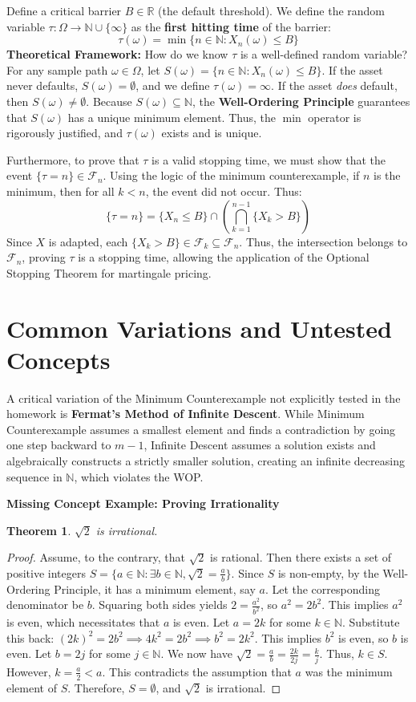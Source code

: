 \documentclass[11pt, a4paper]{article}
\newtheorem{theorem}{Theorem}[section]
\theoremstyle{definition}
\theoremstyle{remark}
\newcommand{\R}{\mathbb{R}}
\newcommand{\N}{\mathbb{N}}
\newcommand{\F}{\mathcal{F}}
\begin{document}
Define a critical barrier $B \in \R$ (the default threshold). We define the random variable $\tau : \Omega \to \N \cup \{\infty\}$ as the \textbf{first hitting time} of the barrier:
\[
\tau(\omega) = \min \{ n \in \N : X_n(\omega) \le B \}
\]
\textbf{Theoretical Framework:} How do we know $\tau$ is a well-defined random variable? 
For any sample path $\omega \in \Omega$, let $S(\omega) = \{ n \in \N : X_n(\omega) \le B \}$. 
If the asset never defaults, $S(\omega) = \emptyset$, and we define $\tau(\omega) = \infty$. 
If the asset \textit{does} default, then $S(\omega) \neq \emptyset$. Because $S(\omega) \subseteq \N$, the \textbf{Well-Ordering Principle} guarantees that $S(\omega)$ has a unique minimum element. Thus, the $\min$ operator is rigorously justified, and $\tau(\omega)$ exists and is unique. 

Furthermore, to prove that $\tau$ is a valid stopping time, we must show that the event $\{\tau = n\} \in \F_n$. 
Using the logic of the minimum counterexample, if $n$ is the minimum, then for all $k < n$, the event did not occur. Thus:
\[
\{\tau = n\} = \{X_n \le B\} \cap \left( \bigcap_{k=1}^{n-1} \{X_k > B\} \right)
\]
Since $X$ is adapted, each $\{X_k > B\} \in \F_k \subseteq \F_n$. Thus, the intersection belongs to $\F_n$, proving $\tau$ is a stopping time, allowing the application of the Optional Stopping Theorem for martingale pricing.

\newpage
\section{Common Variations and Untested Concepts}

A critical variation of the Minimum Counterexample not explicitly tested in the homework is \textbf{Fermat's Method of Infinite Descent}. While Minimum Counterexample assumes a smallest element and finds a contradiction by going one step backward to $m-1$, Infinite Descent assumes a solution exists and algebraically constructs a strictly smaller solution, creating an infinite decreasing sequence in $\N$, which violates the WOP.

\textbf{Missing Concept Example: Proving Irrationality}
\begin{theorem}
$\sqrt{2}$ is irrational.
\end{theorem}
\begin{proof}
Assume, to the contrary, that $\sqrt{2}$ is rational. Then there exists a set of positive integers $S = \{ a \in \N : \exists b \in \N, \sqrt{2} = \frac{a}{b} \}$.
Since $S$ is non-empty, by the Well-Ordering Principle, it has a minimum element, say $a$. Let the corresponding denominator be $b$.
Squaring both sides yields $2 = \frac{a^2}{b^2}$, so $a^2 = 2b^2$.
This implies $a^2$ is even, which necessitates that $a$ is even. Let $a = 2k$ for some $k \in \N$.
Substitute this back: $(2k)^2 = 2b^2 \implies 4k^2 = 2b^2 \implies b^2 = 2k^2$.
This implies $b^2$ is even, so $b$ is even. Let $b = 2j$ for some $j \in \N$.
We now have $\sqrt{2} = \frac{a}{b} = \frac{2k}{2j} = \frac{k}{j}$.
Thus, $k \in S$. However, $k = \frac{a}{2} < a$. This contradicts the assumption that $a$ was the minimum element of $S$. Therefore, $S = \emptyset$, and $\sqrt{2}$ is irrational.
\end{proof}
\end{document}
